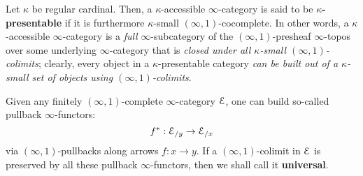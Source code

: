                 \begin{definition}[Presentability] \label{def: presentable_infinity_categories}
                    Let $\kappa$ be regular cardinal. Then, a $\kappa$-accessible $\infty$-category is said to be \textbf{$\kappa$-presentable} if it is furthermore $\kappa$-small $(\infty, 1)$-cocomplete. In other words, a $\kappa$-accessible $\infty$-category is a \textit{full} $\infty$-subcategory of the $(\infty, 1)$-presheaf $\infty$-topos over some underlying $\infty$-category that is \textit{closed under all $\kappa$-small $(\infty, 1)$-colimits}; clearly, every object in a $\kappa$-presentable category \textit{can be built out of a $\kappa$-small set of objects using $(\infty, 1)$-colimits}.
                \end{definition}
                \begin{example}
                    
                \end{example}
                
                \begin{definition} \label{def: universal_colimits}
                    Given any finitely $(\infty, 1)$-complete $\infty$-category $\mathcal{E}$, one can build so-called pullback $\infty$-functors:
                        $$f^*: \mathcal{E}_{/y} \to \mathcal{E}_{/x}$$
                    via $(\infty, 1)$-pullbacks along arrows $f: x \to y$. If a $(\infty, 1)$-colimit in $\mathcal{E}$ is preserved by all these pullback $\infty$-functors, then we shall call it \textbf{universal}.
                \end{definition}
                
